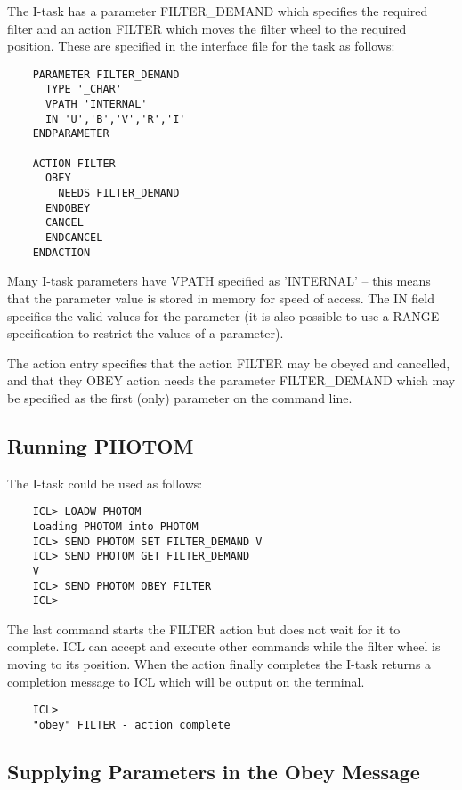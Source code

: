 The I-task has a parameter FILTER\_DEMAND which specifies the required filter
and an action FILTER which moves the filter wheel to the required position.
These are specified in the interface file for the task as follows:

\begin{verbatim}
    PARAMETER FILTER_DEMAND
      TYPE '_CHAR'
      VPATH 'INTERNAL'
      IN 'U','B','V','R','I'
    ENDPARAMETER

    ACTION FILTER
      OBEY
        NEEDS FILTER_DEMAND
      ENDOBEY
      CANCEL
      ENDCANCEL
    ENDACTION
\end{verbatim}

Many I-task parameters have VPATH specified as 'INTERNAL' --
this means that the parameter value is stored in memory for speed of access.
The IN field
specifies the valid values for the parameter (it is also possible to use
a RANGE specification to restrict the values of a parameter).

The action entry specifies that the action FILTER may be obeyed and
cancelled, and that they OBEY action needs the parameter FILTER\_DEMAND which
may be specified as the first (only) parameter on the command line.

                                      
\subsection{Running PHOTOM}

The I-task could be used as follows:

\begin{verbatim}
    ICL> LOADW PHOTOM
    Loading PHOTOM into PHOTOM
    ICL> SEND PHOTOM SET FILTER_DEMAND V
    ICL> SEND PHOTOM GET FILTER_DEMAND
    V
    ICL> SEND PHOTOM OBEY FILTER
    ICL>
\end{verbatim}

The last command starts the FILTER action but does not wait for it to complete.
ICL can accept and execute other commands while the filter wheel is moving
to its position. When the action finally completes the I-task returns a
completion message to ICL which will be output on the terminal.

\begin{verbatim}
    ICL>
    "obey" FILTER - action complete
\end{verbatim}
                               
\subsection{Supplying Parameters in the Obey Message}

